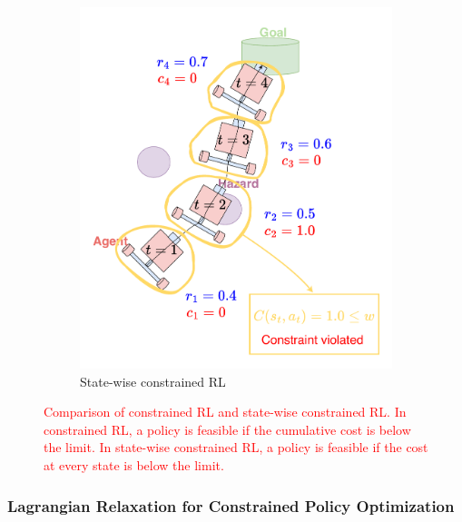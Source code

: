 \begin{figure}[H]
\begin{subfigure}{0.48\textwidth}
        \includegraphics[width=\linewidth]{figure/statewise-constrained-rl.pdf}
        \caption{State-wise constrained RL}
    \end{subfigure}
    \caption{\textcolor{red}{Comparison of constrained RL and state-wise constrained RL.
                            In constrained RL, a policy is feasible if the cumulative cost is below the limit.
                            In state-wise constrained RL, a policy is feasible if the cost at every state is below the limit.}}
\end{figure}



\subsubsection{Lagrangian Relaxation for Constrained Policy Optimization} \label{subsubsec:lagrangian_relaxation}

